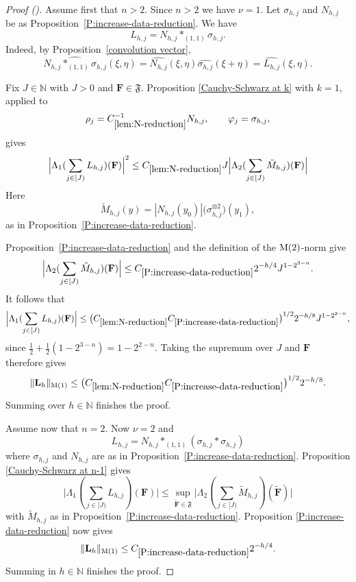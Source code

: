 \documentclass[12pt,reqno]{amsart}
\newcommand{\auto}{{({\tiny\faCar})}}
\theoremstyle{plain}
\numberwithin{equation}{section}
\theoremstyle{remark}
\newcommand{\N}{{\mathbb N}}
\begin{document}
\begin{proof}[Proof \auto]
Assume first that $n>2$.\label{P:diagonal-band-reduction case 1}
Since $n>2$ we have  $\nu=1$.  Let $\sigma_{h,j}$ and $N_{h,j}$ be as  Proposition~\ref{P:increase-data-reduction}.
We have
\begin{equation}
    \label{E:diagonal-band-reduction-factorization}
    L_{h,j}
    =
    N_{h,j}\ast_{(1,1)}\sigma_{h,j}.
\end{equation}
Indeed, by Proposition~\ref{convolution vector},
\[\widehat{
N_{h,j}\ast_{(1,1)}\sigma_{h,j}
}(\xi,\eta)=
\widehat{N_{h,j}}(\xi,\eta)
\widehat{\sigma_{h,j}}(\xi+\eta)=
\widehat{L_{h,j}}(\xi,\eta).
\]

Fix
\(J\in\mathbb N\) with \(J>0\) and \(\mathbf F\in\mathfrak F\).
 Proposition
\ref{Cauchy-Schwarz at k}  with \(k=1\), applied to
\[
\rho_j=C_{\ref{lem:N-reduction}}^{-1}N_{h,j},
\qquad
\varphi_j=\sigma_{h,j},
\]
gives
\[
\Big|
\Lambda_1(\sum_{j\in[J)}L_{h,j})(\mathbf F)
\Big|^2
\leq C_{\ref{lem:N-reduction}} J
\Big|
\Lambda_2(
\sum_{j\in[J)}\tilde M_{h,j}
)(\mathbf F)
\Big|
\]
Here
\[
\tilde M_{h,j}(y)
=
|N_{h,j}(y_0)|
\bigl(\sigma_{h,j}^{\otimes2}\bigr)(y_1),
\]
as in Proposition~\ref{P:increase-data-reduction}.

 Proposition~\ref{P:increase-data-reduction} and the
definition of the \({\rm M}(2)\)-norm give
\[
\Big |
\Lambda_2 (
\sum_{j\in[J)}\tilde M_{h,j}
)(\mathbf F)
\Big |
\leq
C_{\ref{P:increase-data-reduction}}
2^{-h/4}
J^{1-2^{3-n}}.
\]
It follows that
\[
\Big|
\Lambda_1(\sum_{j\in[J)}L_{h,j})(\mathbf F)
\Big|
\leq
\bigl(
C_{\ref{lem:N-reduction}}
C_{\ref{P:increase-data-reduction}}
\bigr)^{1/2}
2^{-h/8}
J^{1-2^{2-n}},
\]
since
$
\frac12+\frac12(1-2^{3-n})
=
1-2^{2-n}.
$
Taking the supremum over \(J\) and \(\mathbf F\) therefore gives
\begin{equation}
    \label{E:diagonal-band-reduction-n-greater-2}
    \|\mathbf L_h\|_{\mathrm M(1)}
    \leq
    \bigl(
    C_{\ref{lem:N-reduction}}
    C_{\ref{P:increase-data-reduction}}
    \bigr)^{1/2}
    2^{-h/8}.
\end{equation}
Summing over $h\in \N$ finishes the proof.

Assume now that $n=2$.\label{P:diagonal-band-reduction case 2}
Now $\nu=2$ and
    \[
L_{h,j}
=
N_{h,j}\ast_{(1,1)}
(\sigma_{h,j}\ast\sigma_{h,j})
\]
where    $\sigma_{h,j}$   and $N_{h,j}$ are  as   in Proposition~\ref{P:increase-data-reduction}.
Proposition
\ref{Cauchy-Schwarz at n-1} gives
\[
\Big|
\Lambda_1(\sum_{j\in[J)}L_{h,j})(\mathbf F)
\Big|
\leq
\sup_{\widetilde{\mathbf F}\in\mathfrak F}
\Big|
\Lambda_2(
\sum_{j\in[J)}\tilde M_{h,j}
)(\tilde{\mathbf F})
\Big|
\]
with $\tilde M_{h,j}$ as in Proposition~\ref{P:increase-data-reduction}.
Proposition \ref{P:increase-data-reduction} now gives
\begin{equation}
    \label{E:diagonal-band-reduction-n-equals-2}
    \|\mathbf L_h\|_{\mathrm M(1)}
    \leq
    C_{\ref{P:increase-data-reduction}}2^{-h/4}.
\end{equation}
Summing in $h\in \N$ finishes the proof.
\end{proof}
\end{document}
